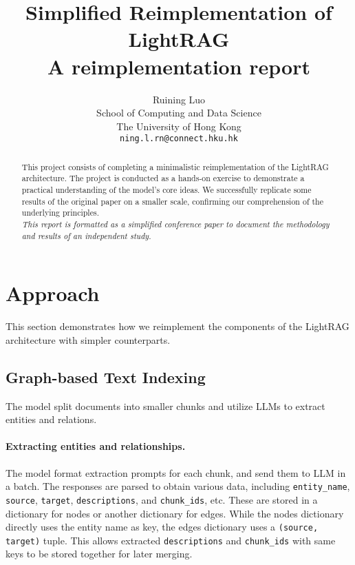 \documentclass{article}
\title{
  Simplified Reimplementation of LightRAG \\
  \vspace{1em}
  \small{\normalfont A reimplementation report} 
}
\author{
  Ruining Luo \\
  School of Computing and Data Science \\
  The University of Hong Kong\\
  \texttt{ning.l.rn@connect.hku.hk} \\
}
\begin{document}
\maketitle

\begin{abstract}
  This project consists of completing a minimalistic reimplementation of the LightRAG architecture\cite{guo2024lightrag}.
  The project is conducted as a hands-on exercise to demonstrate a practical understanding of the model's core ideas.
  We successfully replicate some results of the original paper on a smaller scale,
  confirming our comprehension of the underlying principles.\\
  \textit{This report is formatted as a simplified conference paper to document the methodology and results of an independent study.}
\end{abstract}

\section{Approach}
  This section demonstrates how we reimplement the components of the LightRAG architecture with simpler counterparts.

  \subsection{Graph-based Text Indexing}
    The model split documents into smaller chunks and utilize LLMs to extract entities and relations.
    
    \paragraph{Extracting entities and relationships.}
        The model format extraction prompts for each chunk,
        and send them to LLM in a batch.
        The responses are parsed to obtain various data, 
        including \verb|entity_name|, \verb|source|, \verb|target|, \verb|descriptions|, and \verb|chunk_ids|, etc.
        These are stored in a dictionary for nodes or another dictionary for edges.
        While the nodes dictionary directly uses the entity name as key,
        the edges dictionary uses a \verb|(source, target)| tuple.
        This allows extracted \verb|descriptions| and \verb|chunk_ids| with same keys to be stored together for later merging.
\end{document}
